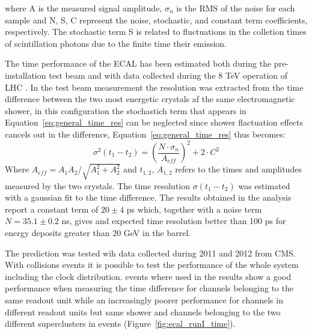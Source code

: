 where A is the measured signal amplitude, $\sigma_n$ is the RMS of the noise for each sample and
N, S, C represent the noise, stochastic, and constant term coefficients, respectively.
The stochastic term S is related to fluctuations in the colletion times of scintillation photons due to
the finite time their emission.


The time performance of the ECAL has been estimated both during the pre-installation test beam \cite{ecal_time_reco}
and with data collected during the 8 TeV operation of LHC \cite{delRe_time_ecal}.
In the test beam measurement the resolution was extracted from the time difference between the two most energetic crystals
af the same electromagnetic shower, in this configuration the stochastich term that appears in Equation~\ref{eq:general_time_res}
can be neglected since shower flactuation effects cancels out in the difference, Equation~\ref{eq:general_time_res} thus becomes:
\begin{equation}
  \sigma^2(t_1 - t_2) = \left( \frac{N\cdot\sigma_n}{A_{eff}} \right)^2 + 2 \cdot C^2
\end{equation}
\label{eq:ecal_time_res}
Where $A_{eff} = A_1A_2/\sqrt{A_1^2+A_2^2}$ and $t_{1,2}$, $A_{1,2}$ refers to the times and amplitudes measured by the two crystals. 
The time resolution $\sigma(t_1-t_2)$ was estimated with a gaussian fit to the time difference.
The results obtained in the analysis report a constant term of $20 \pm 4$ ps which, together with a noise term $N = 35.1\pm 0.2$ ns,
gives and expected time resolution better than 100 ps for energy deposits greater than 20 GeV in the barrel.

The prediction was tested wih data collected during 2011 and 2012 from CMS. With collisions events it is possible to
test the performance of the whole system including the clock distribution. \Zee events where used in \cite{delRe_time_ecal}
the results show a good performance when measuring the time difference for channels belonging to the same readout unit while
an increasingly poorer performance for channels in different readout units but same shower and channels belonging to
the two different superclusters in \Zee events (Figure~\ref{fig:ecal_runI_time}).

